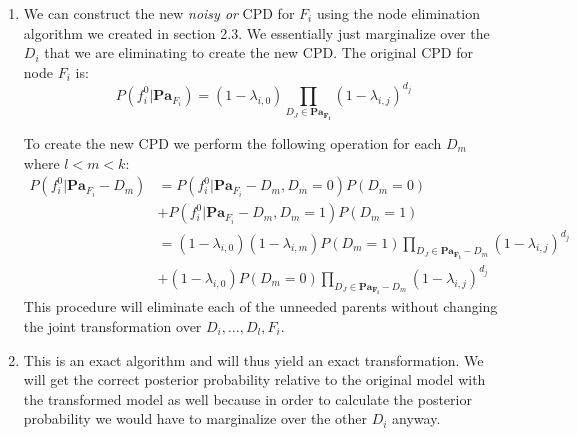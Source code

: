 \documentclass[12pt]{article}
\begin{document}
        \subsubsection{}
        \begin{enumerate}
        \item
        We can construct the new \emph{noisy or} CPD for $F_i$ using the node elimination
        algorithm we created in section 2.3. We essentially just marginalize over the
        $D_i$ that we are eliminating to create the new CPD\@. The original CPD for
        node $F_i$ is:
        \begin{equation*}
            P(f_i^0 | \boldsymbol{Pa}_{F_i}) = (1 - \lambda_{i,0}) \prod_{D_J \in \boldsymbol{Pa_{F_i}}} (1 - \lambda_{i,j})^{d_j}
        \end{equation*}

        To create the new CPD we perform the following operation for each $D_m$
        where $l < m < k$:
        \begin{align*}
                P(f_i^0 | \boldsymbol{Pa}_{F_i} - {D_m}) & =
                P(f_i^0 | \boldsymbol{Pa}_{F_i} - {D_m}, D_m = 0) P(D_m = 0)\\
                & + P(f_i^0 | \boldsymbol{Pa}_{F_i} - {D_m}, D_m = 1) P(D_m = 1)\\
                & = (1 - \lambda_{i,0})(1-\lambda_{i,m}) P(D_m = 1) \prod_{D_J \in \boldsymbol{Pa_{F_i}} - {D_m}} (1 - \lambda_{i,j})^{d_j}\\
                & + (1 - \lambda_{i,0}) P(D_m = 0) \prod_{D_J \in \boldsymbol{Pa_{F_i}} - {D_m}} (1 - \lambda_{i,j})^{d_j}
        \end{align*}
        This procedure will eliminate each of the unneeded parents without changing the joint
        transformation over $D_i, \ldots, D_l, F_i$.
        \item
        This is an exact algorithm and will thus yield an exact transformation. We will
        get the correct posterior probability relative to the original model with the
        transformed model as well because in order to calculate the posterior probability
        we would have to marginalize over the other $D_i$ anyway.
        \end{enumerate}
\end{document}

